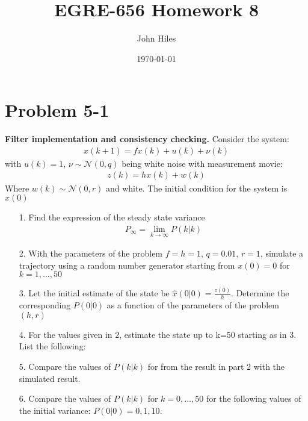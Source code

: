 \documentclass{article}
\title{EGRE-656 Homework 8}
\author{John Hiles}
\date\today
\begin{document}
\maketitle %

\section*{Problem 5-1}
\textbf{Filter implementation and consistency checking.}
Consider the system:
\begin{align*}
x(k+1) = f x(k) + u(k) + \nu(k)
\end{align*}
with $u(k)=1$, $\nu \sim \mathcal{N}(0,q)$ being white noise with measurement movie:
\begin{align*}
z(k) = h x(k) + w(k)
\end{align*}
Where $w(k) \sim \mathcal{N}(0,r)$ and white. The initial condition for the system is $x(0)$
\begin{enumerate}
\item[1.] Find the expression of the steady state variance
\begin{align*}
P_{\infty} = \lim_{k \rightarrow \infty} P(k|k)
\end{align*}
\item[2.] With the parameters of the problem $f=h=1$, $q=0.01$, $r=1$, simulate a trajectory using a random number generator starting from $x(0)=0$ for $k=1,...,50$
\item[3.] Let the initial estimate of the state be $\hat{x}(0|0)=\frac{z(0)}{h}$. Determine the corresponding $P(0|0)$ as a function of the parameters of the problem $(h,r)$
\item[4.] For the values given in 2, estimate the state up to k=50 starting as in 3. List the following:
\item[5.] Compare the values of $P(k|k)$ for from the result in part 2 with the simulated result.
\item[6.] Compare the values of $P(k|k)$ for $k=0,...,50$ for the following values of the initial variance: $P(0|0) = 0,1,10$.
\end{enumerate}
\end{document}
